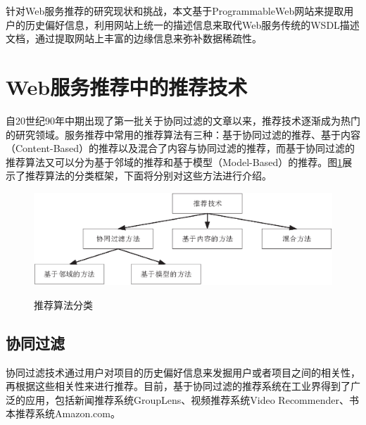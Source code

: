 \documentclass[master,winfonts]{njuthesis}
\begin{document}
针对Web服务推荐的研究现状和挑战，本文基于ProgrammableWeb网站来提取用户的历史偏好信息，利用网站上统一的描述信息来取代Web服务传统的WSDL描述文档，通过提取网站上丰富的边缘信息来弥补数据稀疏性。

\section{Web服务推荐中的推荐技术}
自20世纪90年中期出现了第一批关于协同过滤的文章\cite{Hill:1995:REC:223904.223929,resnick94:_grouplens}以来，推荐技术逐渐成为热门的研究领域。服务推荐中常用的推荐算法有三种：基于协同过滤的推荐、基于内容（Content-Based）的推荐以及混合了内容与协同过滤的推荐，而基于协同过滤的推荐算法又可以分为基于邻域的推荐和基于模型（Model-Based）的推荐。图\ref{fig:2}展示了推荐算法的分类框架，下面将分别对这些方法进行介绍。
\begin{figure}[htbp]
  \centering
  \includegraphics[width=\textwidth]{CF1.eps}\\
  \caption{推荐算法分类}\label{fig:2}
\end{figure}

\subsection{协同过滤}
协同过滤技术通过用户对项目的历史偏好信息来发掘用户或者项目之间的相关性，再根据这些相关性来进行推荐。目前，基于协同过滤的推荐系统在工业界得到了广泛的应用，包括新闻推荐系统GroupLens\cite{resnick94:_grouplens}、视频推荐系统Video Recommender\cite{Hill:1995:REC:223904.223929}、书本推荐系统Amazon.com\cite{Linden-Amazon-2003}。
\end{document}
